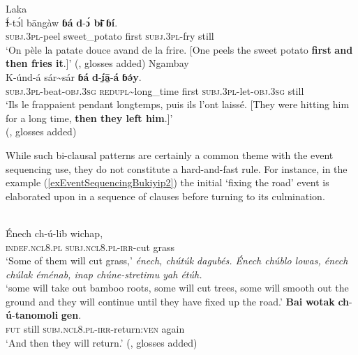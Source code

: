 \begin{exe}
		\ex Laka\label{exEventSequencingLaka}\\
		\gll \sout{Í}-tɔ́l bāngàw \textbf{ɓá} \textbf{d}-\textbf{{ɔ́ bɨ̄}} \textbf{ɓí}.\\
		\textsc{subj}.\textsc{3pl}-peel sweet\_potato first \textsc{subj}.\textsc{3pl}-fry still\\
		\glt \lq On pèle la patate douce avand de la frire. [One peels the sweet potato \textbf{first} \textbf{and then fries it}.]\rq{ }(\cite[123]{Keegan2014}, glosses added)
		\ex Ngambay\label{exEventSequencingNgambay}\\
		\gll K-únd-á sár\sim{}sár \textbf{ɓá} \textbf{d}-\textbf{ḭ́ā̰}-\textbf{á} \textbf{ɓə́y}.\\
	\textsc{subj}.3\textsc{pl}-beat-\textsc{obj}.3\textsc{sg} \textsc{redupl}\sim{}long\_time first \textsc{subj}.3\textsc{pl}-let-\textsc{obj}.3\textsc{sg} still\\
		\glt \lq Ils le frappaient pendant longtemps, puis ils l'ont  laissé. [They were hitting him for a long time, \textbf{then they left him}.]\rq{}
	\\(\cite[259]{Keegan2014}, glosses added)
\end{exe}

While such bi-clausal patterns are certainly a common theme with the event sequencing use, they do not constitute a hard-and-fast rule. For instance, in the  example (\ref{exEventSequencingBukiyip2}) the initial \lq fixing the road\rq{ }event is elaborated upon in a sequence of clauses before turning to its culmination.

\begin{exe}
	\ex {}\label{exEventSequencingBukiyip2}\\
	 \gll Énech ch-ú-lib wichap,\\
	 \textsc{indef}.\textsc{ncl}8.\textsc{pl} \textsc{subj}.\textsc{ncl}8.\textsc{pl}-\textsc{irr}-cut grass\\
	 \glt \lq Some of them will cut grass,\rq{}
	 \sn  \textit{énech, chútúk dagubés. Énech chúblo lowas, énech chúlak éménab, inap chúne-stretimu yah étúh.}\\
	 \lq  some will take out bamboo roots, some will cut trees, some will smooth out the ground and they will continue until they have fixed up the road.\rq{}
	 \sn
	 \gll \textbf{Bai} \textbf{wotak} \textbf{ch}-\textbf{ú}-\textbf{tanomoli} \textbf{gen}.\\
	\textsc{fut} still \textsc{subj}.\textsc{ncl}8.\textsc{pl}-\textsc{irr}-return:\textsc{ven} again\\
	\glt \lq And then they will return.' (\cite[126]{ConradWigoga1991}, glosses added)
\end{exe}


